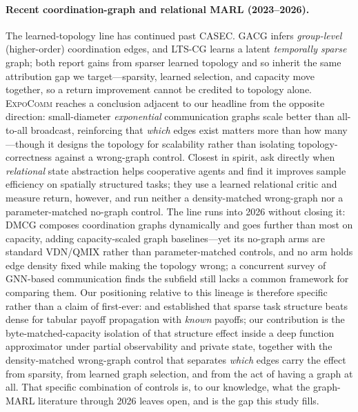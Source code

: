 \documentclass[10pt]{article}
\newcommand{\algoname}[1]{\textsc{#1}}
\begin{document}
\paragraph{Recent coordination-graph and relational MARL (2023--2026).} The
learned-topology line has continued past \algoname{CASEC}. \algoname{GACG}
\citep{duan_2024_gacg} infers \emph{group-level} (higher-order) coordination
edges, and \algoname{LTS-CG} \citep{duan_2024_ltscg} learns a latent
\emph{temporally sparse} graph; both report gains from sparser learned topology
and so inherit the same attribution gap we target---sparsity, learned selection,
and capacity move together, so a return improvement cannot be credited to
topology alone. \algoname{ExpoComm} \citep{li_2025_expocomm} reaches a conclusion
adjacent to our headline from the opposite direction: small-diameter
\emph{exponential} communication graphs scale better than all-to-all broadcast,
reinforcing that \emph{which} edges exist matters more than how many---though it
designs the topology for scalability rather than isolating topology-correctness
against a wrong-graph control. Closest in spirit,
\citet{utke_2025_relabstraction} ask directly when \emph{relational} state
abstraction helps cooperative agents and find it improves sample efficiency on
spatially structured tasks; they use a learned relational critic and measure
return, however, and run neither a density-matched wrong-graph nor a
parameter-matched no-graph control. The line runs into 2026 without closing it:
\algoname{DMCG} \citep{gupta_2026_dmcg} composes coordination graphs dynamically
and goes further than most on capacity, adding capacity-scaled graph
baselines---yet its no-graph arms are standard \algoname{VDN}/\algoname{QMIX}
rather than parameter-matched controls, and no arm holds edge density fixed while
making the topology wrong; a concurrent survey of GNN-based communication
\citep{cuzinrambaud_2026_survey} finds the subfield still lacks a common
framework for comparing them. Our positioning relative to this lineage is
therefore specific rather than a claim of first-ever: \citet{kok_2004_sparseq}
and \citet{kok_2006_payoffprop} established that sparse task structure beats
dense for tabular payoff propagation with \emph{known} payoffs; our contribution
is the byte-matched-capacity isolation of that structure effect inside a deep
function approximator under partial observability and private state, together
with the density-matched wrong-graph control that separates \emph{which} edges
carry the effect from sparsity, from learned graph selection, and from the act
of having a graph at all. That specific combination of controls is, to our
knowledge, what the graph-MARL literature through 2026 leaves open, and is the
gap this study fills.
\end{document}
